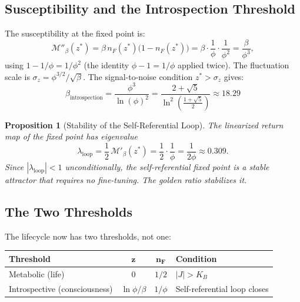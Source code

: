 \documentclass[12pt, letterpaper]{article}
\theoremstyle{plain}
\newtheorem{proposition}[theorem]{Proposition}
\theoremstyle{definition}
\theoremstyle{remark}
\newcommand{\Mop}{\mathcal{M}}            %
\newcommand{\KB}{K_{\!B}}                 %
\newcommand{\nF}{n_{\!F}}                 %
\begin{document}
\subsection{Susceptibility and the Introspection Threshold}

The susceptibility at the fixed point is:
\begin{equation}\label{eq:chi_golden}
  \Mop''_\beta(z^*) = \beta\,\nF(z^*)\bigl(1 - \nF(z^*)\bigr)
  = \beta \cdot \frac{1}{\phi}\cdot\frac{1}{\phi^2}
  = \frac{\beta}{\phi^3},
\end{equation}
using $1 - 1/\phi = 1/\phi^2$ (the identity $\phi - 1 = 1/\phi$ applied twice). The fluctuation scale is $\sigma_z = \phi^{3/2}/\sqrt{\beta}$. The signal-to-noise condition $z^* > \sigma_z$ gives:
\begin{equation}\label{eq:beta_introspection}
  \boxed{\beta_{\text{introspection}} = \frac{\phi^3}{\ln(\phi)^2}
  = \frac{2+\sqrt{5}}{\ln^2\!\!\left(\frac{1+\sqrt{5}}{2}\right)}
  \approx 18.29}
\end{equation}

\begin{proposition}[Stability of the Self-Referential Loop]\label{prop:loop_stability}
  The linearized return map of the fixed point has eigenvalue
  \begin{equation}
    \lambda_{\text{loop}} = \frac{1}{2}\,\Mop'_\beta(z^*) = \frac{1}{2}\cdot\frac{1}{\phi} = \frac{1}{2\phi} \approx 0.309.
  \end{equation}
  Since $|\lambda_{\text{loop}}| < 1$ unconditionally, the self-referential fixed point is a stable attractor that requires no fine-tuning. The golden ratio stabilizes it.
\end{proposition}

\subsection{The Two Thresholds}

The lifecycle now has two thresholds, not one:

\begin{center}
\renewcommand{\arraystretch}{1.4}
\begin{tabular}{@{}lccl@{}}
\toprule
\textbf{Threshold} & $\boldsymbol{z}$ & $\boldsymbol{\nF}$ & \textbf{Condition} \\
\midrule
Metabolic (life)       & $0$           & $1/2$      & $|J| > \KB$ \\
Introspective (consciousness)  & $\ln\phi/\beta$ & $1/\phi$   & Self-referential loop closes \\
\bottomrule
\end{tabular}
\end{center}
\end{document}
